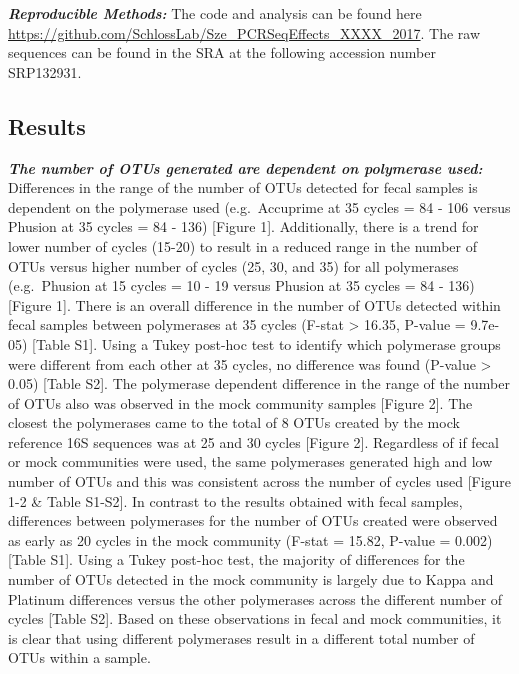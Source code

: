 \documentclass[11pt,]{article}
\begin{document}
\textbf{\emph{Reproducible Methods:}} The code and analysis can be found
here \url{https://github.com/SchlossLab/Sze_PCRSeqEffects_XXXX_2017}.
The raw sequences can be found in the SRA at the following accession
number SRP132931.

\newpage

\subsection{Results}\label{results}

\textbf{\emph{The number of OTUs generated are dependent on polymerase
used:}} Differences in the range of the number of OTUs detected for
fecal samples is dependent on the polymerase used (e.g.~Accuprime at 35
cycles = 84 - 106 versus Phusion at 35 cycles = 84 - 136) {[}Figure
1{]}. Additionally, there is a trend for lower number of cycles (15-20)
to result in a reduced range in the number of OTUs versus higher number
of cycles (25, 30, and 35) for all polymerases (e.g.~Phusion at 15
cycles = 10 - 19 versus Phusion at 35 cycles = 84 - 136) {[}Figure 1{]}.
There is an overall difference in the number of OTUs detected within
fecal samples between polymerases at 35 cycles (F-stat \textgreater{}
16.35, P-value = 9.7e-05) {[}Table S1{]}. Using a Tukey post-hoc test to
identify which polymerase groups were different from each other at 35
cycles, no difference was found (P-value \textgreater{} 0.05) {[}Table
S2{]}. The polymerase dependent difference in the range of the number of
OTUs also was observed in the mock community samples {[}Figure 2{]}. The
closest the polymerases came to the total of 8 OTUs created by the mock
reference 16S sequences was at 25 and 30 cycles {[}Figure 2{]}.
Regardless of if fecal or mock communities were used, the same
polymerases generated high and low number of OTUs and this was
consistent across the number of cycles used {[}Figure 1-2 \& Table
S1-S2{]}. In contrast to the results obtained with fecal samples,
differences between polymerases for the number of OTUs created were
observed as early as 20 cycles in the mock community (F-stat = 15.82,
P-value = 0.002) {[}Table S1{]}. Using a Tukey post-hoc test, the
majority of differences for the number of OTUs detected in the mock
community is largely due to Kappa and Platinum differences versus the
other polymerases across the different number of cycles {[}Table S2{]}.
Based on these observations in fecal and mock communities, it is clear
that using different polymerases result in a different total number of
OTUs within a sample.
\end{document}
